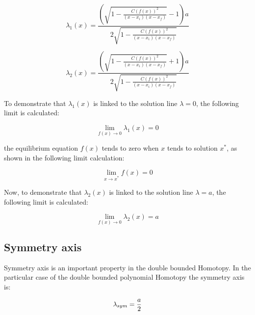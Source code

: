 \documentclass[conference,letterpaper,twocolumn]{IEEEtran}
\begin{document}
\begin{equation}
\lambda_1(x)= {\frac {\left( \sqrt {1-{\frac {C \left( f \left( x \right)  \right) ^{2
}}{ \left( x-x_i \right)  \left( x-x_f \right) }}}-1
 \right) a}{2\sqrt {1-{\frac {C \left( f \left( x \right) 
 \right) ^{2}}{ \left( x-x_i \right)  \left( x-x_f
 \right) }}}}}
\label{SB1}
\end{equation}

\begin{equation}
\lambda_2(x)= {\frac {\left( \sqrt {1-{\frac {C \left( f \left( x \right)  \right) ^{2
}}{ \left( x-x_i \right)  \left( x-x_f \right) }}}+1
 \right) a}{2\sqrt {1-{\frac {C \left( f \left( x \right) 
 \right) ^{2}}{ \left( x-x_i \right)  \left( x-x_f
 \right) }}}}}
\label{SB2}
\end{equation}

To demonstrate that $\lambda_1(x)$ is linked to the solution line $\lambda=0$, the following limit is calculated:

\begin{equation}
 \displaystyle\lim_{f(x) \to{0}}{\lambda_1(x)}=0 
 \label{demos1x}
\end{equation}

the equilibrium equation $f(x)$ tends to zero when $x$ tends to solution $x^*$, as shown in the following limit calculation:

\begin{equation}
 \displaystyle\lim_{x \to{x^*}}{f(x)}=0 
 \label{demos1x2}
\end{equation}

Now, to demonstrate that $\lambda_2(x)$ is linked to the solution line $\lambda=a$, the following limit is calculated:

\begin{equation}
 \displaystyle\lim_{f(x) \to{0}}{\lambda_2(x)}=a 
 \label{demos2x}
\end{equation}



\subsection{Symmetry axis}

Symmetry axis is an important property in the double bounded Homotopy. In the particular case of the double bounded polynomial Homotopy the symmetry axis is:

\begin{equation}
\lambda_{sym}= {a \over 2}
\label{sym}
\end{equation}
\end{document}
